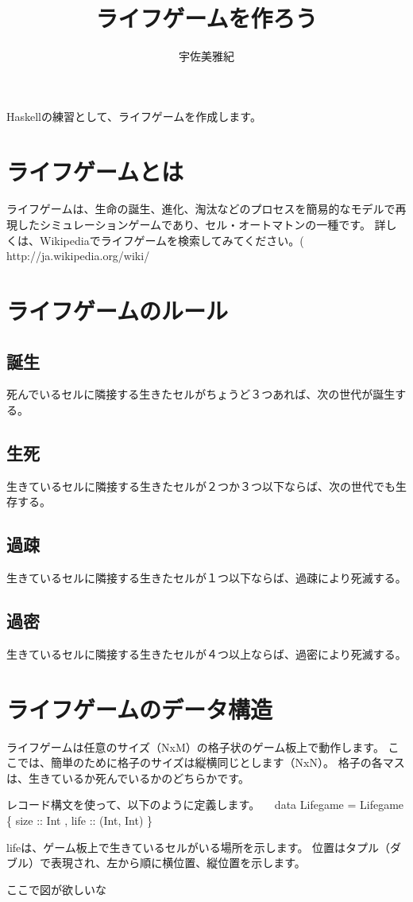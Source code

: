 \documentclass{jsarticle}
\begin{document}
\title{ライフゲームを作ろう}
\author{宇佐美雅紀}
\maketitle

Haskellの練習として、ライフゲームを作成します。

\section{ライフゲームとは}
ライフゲームは、生命の誕生、進化、淘汰などのプロセスを簡易的なモデルで再現したシミュレーションゲームであり、セル・オートマトンの一種です。
詳しくは、Wikipediaでライフゲームを検索してみてください。( http://ja.wikipedia.org/wiki/%

\section{ライフゲームのルール}
\subsection*{誕生}
死んでいるセルに隣接する生きたセルがちょうど３つあれば、次の世代が誕生する。
\subsection*{生死}
生きているセルに隣接する生きたセルが２つか３つ以下ならば、次の世代でも生存する。
\subsection*{過疎}
生きているセルに隣接する生きたセルが１つ以下ならば、過疎により死滅する。
\subsection*{過密}
生きているセルに隣接する生きたセルが４つ以上ならば、過密により死滅する。

\section{ライフゲームのデータ構造}
ライフゲームは任意のサイズ（NxM）の格子状のゲーム板上で動作します。
ここでは、簡単のために格子のサイズは縦横同じとします（NxN）。
格子の各マスは、生きているか死んでいるかのどちらかです。

レコード構文を使って、以下のように定義します。
　data Lifegame = Lifegame \{ size :: Int
                           , life :: (Int, Int)
                           \}

lifeは、ゲーム板上で生きているセルがいる場所を示します。
位置はタプル（ダブル）で表現され、左から順に横位置、縦位置を示します。

ここで図が欲しいな~
\end{document}
